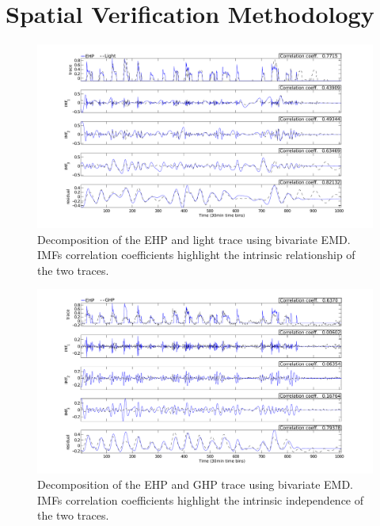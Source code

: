 \section{Spatial Verification Methodology}

\begin{figure}[th!]
\hspace{-2cm}
\includegraphics[width=1.2\textwidth]{figs/emd_25_26-eps-converted-to}
\vspace{-1cm}
\caption{Decomposition of the EHP and light trace using bivariate EMD. IMFs correlation coefficients highlight the intrinsic relationship of the two traces.}
\label{fig:emd}
\end{figure}

\begin{figure}[tb]
\hspace{-2cm}
\includegraphics[width=1.2\textwidth]{figs/emd_25_41-eps-converted-to}
\vspace{-1cm}
\caption{Decomposition of the EHP and GHP trace using bivariate EMD. IMFs correlation coefficients highlight the intrinsic independence of the two traces.}
\label{fig:emd2}
\end{figure}


